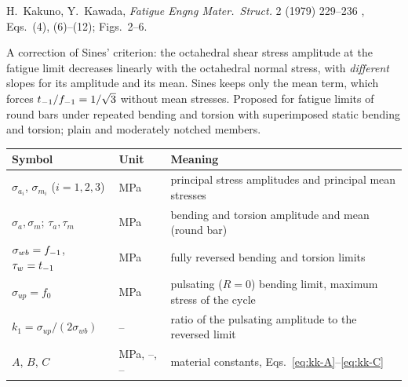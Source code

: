 \label{sheet:KAKUNO}

 H.~Kakuno, Y.~Kawada, \emph{Fatigue Engng Mater.\ Struct.} 2 (1979) 229--236
\cite{kakuno1979}, Eqs.~(4), (6)--(12); Figs.~2--6.

 A correction of Sines' criterion: the octahedral shear stress amplitude at
the fatigue limit decreases linearly with the octahedral normal stress, with \emph{different}
slopes for its amplitude and its mean. Sines keeps only the mean term, which forces
$t_{-1}/f_{-1}=1/\sqrt3$ without mean stresses. Proposed for fatigue limits of round bars under repeated
bending and torsion with superimposed static bending and torsion; plain and moderately notched
members.

\begin{center}\small
\begin{tabular}{@{}llp{100mm}@{}}
\toprule
Symbol & Unit & Meaning\\\midrule
$\sigma_{a_i}$, $\sigma_{m_i}$ ($i=1,2,3$) & MPa & principal stress amplitudes and principal mean stresses\\
$\sigma_a,\sigma_m$; $\tau_a,\tau_m$ & MPa & bending and torsion amplitude and mean (round bar)\\
$\sigma_{wb}=f_{-1}$, $\tau_w=t_{-1}$ & MPa & fully reversed bending and torsion limits\\
$\sigma_{up}=f_0$ & MPa & pulsating ($R=0$) bending limit, maximum stress of the cycle\\
$k_1=\sigma_{up}/(2\sigma_{wb})$ & -- & ratio of the pulsating amplitude to the reversed limit\\
$A$, $B$, $C$ & MPa, --, -- & material constants, Eqs.~\eqref{eq:kk-A}--\eqref{eq:kk-C}\\
\bottomrule
\end{tabular}
\end{center}

